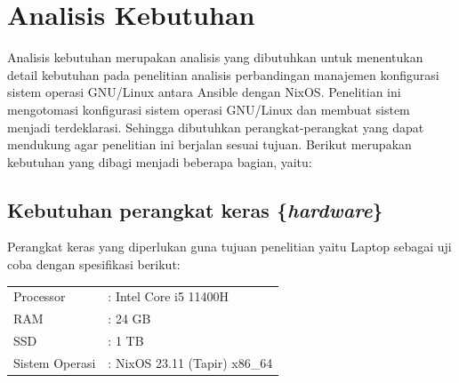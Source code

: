 \documentclass[10pt,]{report}
\begin{document}
\section{Analisis Kebutuhan}
\vspace{-3mm}
\begin{adjustwidth}{7mm}{}
	Analisis kebutuhan merupakan analisis yang dibutuhkan untuk menentukan detail
	kebutuhan pada penelitian analisis perbandingan manajemen konfigurasi sistem
	operasi GNU/Linux antara Ansible dengan NixOS. Penelitian ini mengotomasi
	konfigurasi sistem operasi GNU/Linux dan membuat sistem menjadi terdeklarasi.
	Sehingga dibutuhkan perangkat-perangkat yang dapat mendukung agar penelitian
	ini berjalan sesuai tujuan. Berikut merupakan kebutuhan yang dibagi menjadi
	beberapa bagian, yaitu:
\end{adjustwidth}
\begin{adjustwidth}{7mm}{}
	\subsection{Kebutuhan perangkat keras \{\textit{hardware}\}}
	\vspace{-2mm}
	\begin{adjustwidth}{6mm}{}
		Perangkat keras yang diperlukan guna tujuan penelitian yaitu Laptop sebagai
		uji coba dengan spesifikasi berikut:
	\end{adjustwidth}
	\begin{adjustwidth}{4mm}{}
		\begin{tabular}{ll}
			Processor      & : Intel Core i5 11400H        \\
			RAM            & : 24 GB                       \\
			SSD            & : 1 TB                        \\
			Sistem Operasi & : NixOS 23.11 (Tapir) x86\_64 \\
		\end{tabular}
	\end{adjustwidth}
\end{adjustwidth}
\end{document}
